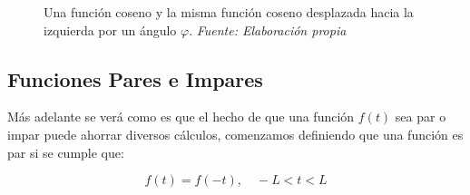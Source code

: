 \begin{figure}[H]
\begin{minipage}{0.5\textwidth}
	\end{minipage}
	\caption[Una función coseno y la misma función coseno desplazada hacia la izquierda por un ángulo $\varphi$.] {Una función coseno y la misma función coseno desplazada hacia la izquierda por un ángulo $\varphi$.\textit{ Fuente: Elaboración propia}  }
	\label{fig:fase-coseno}  %
\end{figure}

\subsection{Funciones Pares e Impares}
Más adelante se verá como es que el hecho de que una función $f(t)$  sea par o impar puede ahorrar diversos cálculos, comenzamos definiendo que una función es par si se cumple que: ~\cite{matesAvanzadasZill}

\begin{equation} \label{eq24}
	f(t) = f(-t) , \quad -L < t < L
\end{equation}

